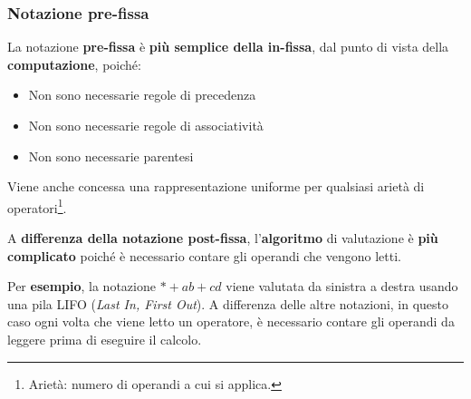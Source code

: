 \documentclass[a4paper]{article}
\begin{document}
	\subsubsection{Notazione pre-fissa}\label{notazione pre-fissa}
	
	La notazione \textcolor{Red3}{\textbf{pre-fissa}} è \textbf{più semplice della in-fissa}, dal punto di vista della \textbf{computazione}, poiché:
	\begin{itemize}
		\item Non sono necessarie regole di precedenza
		\item Non sono necessarie regole di associatività
		\item Non sono necessarie parentesi
	\end{itemize}
	Viene anche concessa una rappresentazione uniforme per qualsiasi arietà di operatori\footnote{Arietà: numero di operandi a cui si applica.}.\newline
	
	\noindent
	A \textbf{differenza della notazione post-fissa}, l'\textbf{algoritmo} di valutazione è \textbf{più complicato} poiché è necessario contare gli operandi che vengono letti.\newline
	
	\noindent
	Per \textcolor{Green4}{\textbf{esempio}}, la notazione $*+ab+cd$ viene valutata da sinistra a destra usando una pila LIFO (\emph{Last In, First Out}). A differenza delle altre notazioni, in questo caso ogni volta che viene letto un operatore, è necessario contare gli operandi da leggere prima di eseguire il calcolo.\newline
	
\end{document}

